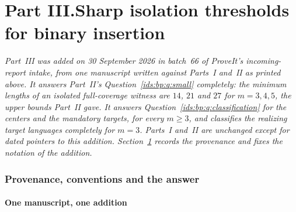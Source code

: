 \documentclass[11pt,letterpaper]{article}
\theoremstyle{definition}\newtheorem{definition}[theorem]{Definition}
\theoremstyle{remark}\newtheorem{remark}[theorem]{Remark}
\theoremstyle{definition}\newtheorem{question}[theorem]{Question}
\begin{document}
\clearpage
{}\part*{Part III.\quad Sharp isolation thresholds for binary insertion}

\noindent\emph{Part~III was added on 30 September 2026 in batch~66 of
ProveIt's incoming-report intake, from one manuscript written against
Parts~I and~II as printed above. It answers Part~II's
Question~\ref{ids:bp:q:small} completely: the minimum lengths of an isolated
full-coverage witness are $14$, $21$ and $27$ for $m=3,4,5$, the upper bounds
Part~II gave. It answers Question~\ref{ids:bp:q:classification} for the
centers and the mandatory targets, for every $m\geq3$, and classifies the
realizing target languages completely for $m=3$. Parts~I and~II are unchanged
except for dated pointers to this addition.
Section~\ref{ids:si:sec:scope} records the provenance and fixes the notation
of the addition.}

\section{Provenance, conventions and the answer}\label{ids:si:sec:scope}

\subsection{One manuscript, one addition}\label{ids:si:sec:source}
\end{document}
